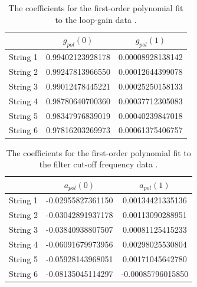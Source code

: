\documentclass[main.tex]{subfiles}
\begin{document}
\begin{table}[h]
\centering
\begin{tabular}{|c| c| c|} 
 \hline
     & $g_{pol}(0)$ & $g_{pol}(1)$ \\ [0.5ex] 
 \hline
 String 1 & 0.99402123928178  & 0.00008928138142 \\ 
 String 2 & 0.99247813966550  & 0.00012644399078 \\ 
 String 3 & 0.99012478445221  & 0.00025250158133 \\ 
 String 4 & 0.98780640700360  & 0.00037712305083 \\ 
 String 5 & 0.98347976839019  & 0.00040239847018 \\ 
 String 6 & 0.97816203269973  & 0.00061375406757 \\ 
 \hline
\end{tabular}
\caption{The coefficients for the first-order polynomial fit to the loop-gain data .}
\label{tab:g_coeff}
\end{table}

\begin{table}[h]
\centering
\begin{tabular}{|c| c| c|} 
 \hline
     & $a_{pol}(0)$ & $a_{pol}(1)$ \\ [0.5ex] 
 \hline
 String 1 & -0.02955827361150  & 0.00134421335136 \\ 
 String 2 & -0.03042891937178  & 0.00113090288951 \\ 
 String 3 & -0.03840938807507  & 0.00081125415233 \\ 
 String 4 & -0.06091679973956  & 0.00298025530804 \\ 
 String 5 & -0.05928143968051  & 0.00171045642780 \\ 
 String 6 & -0.08135045114297  & -0.00085796015850 \\ 
 \hline
\end{tabular}
\caption{The coefficients for the first-order polynomial fit to the filter cut-off frequency data .}
\label{tab:a_coeff}
\end{table}
\end{document}
